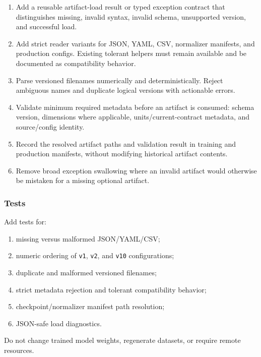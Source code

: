 \documentclass[
]{article}
\providecommand{\tightlist}{%
  \setlength{\itemsep}{0pt}\setlength{\parskip}{0pt}}
\begin{document}
\begin{enumerate}
\def\labelenumi{\arabic{enumi}.}
\tightlist
\item
  Add a reusable artifact-load result or typed exception contract that
  distinguishes missing, invalid syntax, invalid schema, unsupported
  version, and successful load.
\item
  Add strict reader variants for JSON, YAML, CSV, normalizer manifests,
  and production configs. Existing tolerant helpers must remain
  available and be documented as compatibility behavior.
\item
  Parse versioned filenames numerically and deterministically. Reject
  ambiguous names and duplicate logical versions with actionable errors.
\item
  Validate minimum required metadata before an artifact is consumed:
  schema version, dimensions where applicable, units/current-contract
  metadata, and source/config identity.
\item
  Record the resolved artifact paths and validation result in training
  and production manifests, without modifying historical artifact
  contents.
\item
  Remove broad exception swallowing where an invalid artifact would
  otherwise be mistaken for a missing optional artifact.
\end{enumerate}

\hypertarget{tests-8}{%
\subsubsection{Tests}\label{tests-8}}

Add tests for:

\begin{enumerate}
\def\labelenumi{\arabic{enumi}.}
\tightlist
\item
  missing versus malformed JSON/YAML/CSV;
\item
  numeric ordering of \texttt{v1}, \texttt{v2}, and \texttt{v10}
  configurations;
\item
  duplicate and malformed versioned filenames;
\item
  strict metadata rejection and tolerant compatibility behavior;
\item
  checkpoint/normalizer manifest path resolution;
\item
  JSON-safe load diagnostics.
\end{enumerate}

Do not change trained model weights, regenerate datasets, or require
remote resources.
\end{document}

